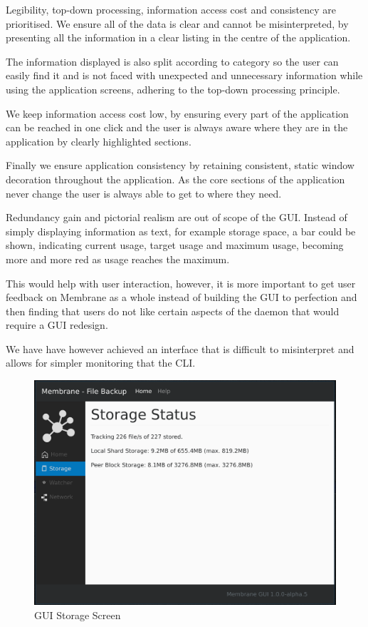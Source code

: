 \documentclass[11pt, a4paper, twocolumn, twoside]{report}
\begin{document}
Legibility, top-down processing, information access cost and consistency are prioritised. We ensure all of the data is clear and cannot be misinterpreted, by presenting all the information in a clear listing in the centre of the application.

The information displayed is also split according to category so the user can easily find it and is not faced with unexpected and unnecessary information while using the application screens, adhering to the top-down processing principle.

We keep information access cost low, by ensuring every part of the application can be reached in one click and the user is always aware where they are in the application by clearly highlighted sections.

Finally we ensure application consistency by retaining consistent, static window decoration throughout the application. As the core sections of the application never change the user is always able to get to where they need.

Redundancy gain and pictorial realism are out of scope of the GUI. Instead of simply displaying information as text, for example storage space, a bar could be shown, indicating current usage, target usage and maximum usage, becoming more and more red as usage reaches the maximum.

This would help with user interaction, however, it is more important to get user feedback on Membrane as a whole instead of building the GUI to perfection and then finding that users do not like certain aspects of the daemon that would require a GUI redesign. 

We have have however achieved an interface that is difficult to misinterpret and allows for simpler monitoring that the CLI.

\begin{figure}[!ht]
 \centering
 \includegraphics[width=\textwidth]{gui-storage}
 \caption{GUI Storage Screen}
 \label{fig:gui-storage}
\end{figure}
\end{document}
